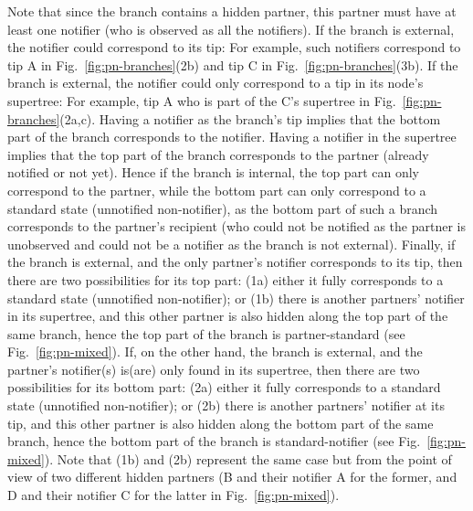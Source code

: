\documentclass[10pt,letterpaper]{article}
\begin{document}
Note that since the branch contains a hidden partner, this partner must have at least one notifier (who is observed as all the notifiers). If the branch is external, the notifier could correspond to its tip: For example, such notifiers correspond to tip A in Fig.~\ref{fig:pn-branches}(2b) and tip C in Fig.~\ref{fig:pn-branches}(3b). If the branch is external, the notifier could only correspond to a tip in its node's supertree: For example, tip A who is part of the C's supertree in Fig.~\ref{fig:pn-branches}(2a,c). 
Having a notifier as the branch's tip implies that the bottom part of the branch corresponds to the notifier. Having a notifier in the supertree implies that the top part of the branch corresponds to the partner (already notified or not yet). Hence if the branch is internal, the top part can only correspond to the partner, while the bottom part can only correspond to a standard state (unnotified non-notifier), as the bottom part of such a branch corresponds to the partner's recipient (who could not be notified as the partner is unobserved and could not be a notifier as the branch is not external). Finally, if the branch is external, and the only partner's notifier corresponds to its tip, then there are two possibilities for its top part: (1a) either it fully corresponds to a standard state (unnotified non-notifier); or (1b) there is another partners' notifier in its supertree, and this other partner is also hidden along the top part of the same branch, hence the top part of the branch is partner-standard (see Fig.~\ref{fig:pn-mixed}). If, on the other hand, the branch is external, and the partner's notifier(s) is(are) only found in its supertree, then there are two possibilities for its bottom part: (2a) either it fully corresponds to a standard state (unnotified non-notifier); or (2b) there is another partners' notifier at its tip, and this other partner is also hidden along the bottom part of the same branch, hence the bottom part of the branch is standard-notifier (see Fig.~\ref{fig:pn-mixed}). Note that (1b) and (2b) represent the same case but from the point of view of two different hidden partners (B and their notifier A for the former, and D and their notifier C for the latter in Fig.~\ref{fig:pn-mixed}).  
\end{document}
